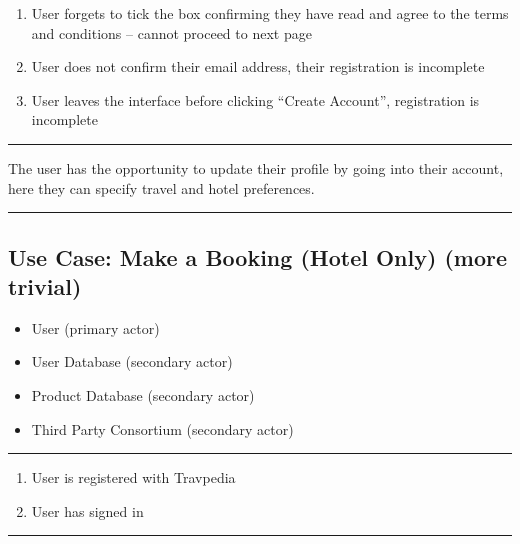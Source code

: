 \begin{enumerate}
	\item User forgets to tick the box confirming they have read and agree
		to the terms and conditions – cannot proceed to next page
	\item User does not confirm their email address, their registration is
		incomplete
	\item User leaves the interface before clicking ``Create Account'',
		registration is incomplete
\end{enumerate}
\noindent\rule{\textwidth}{0.6pt}

The user has the opportunity to update their profile by going into their
account, here they can specify travel and hotel preferences.

\noindent\rule{\textwidth}{0.6pt}

\vspace{4ex}
\hspace{-4.2cm}
\begin{minipage}[h][][s]{1.2\linewidth}
	\subsection{Use Case: Make a Booking (Hotel Only) \small{\textnormal{(more trivial)}}}
\end{minipage}

\begin{itemize}
	\item User (primary actor)
	\item User Database  (secondary actor)
	\item Product Database  (secondary actor)
	\item Third Party Consortium (secondary actor)
\end{itemize}
\noindent\rule{\textwidth}{0.6pt}

\begin{enumerate}
	\item User is registered with Travpedia
	\item User has signed in
\end{enumerate}
\noindent\rule{\textwidth}{0.6pt}

